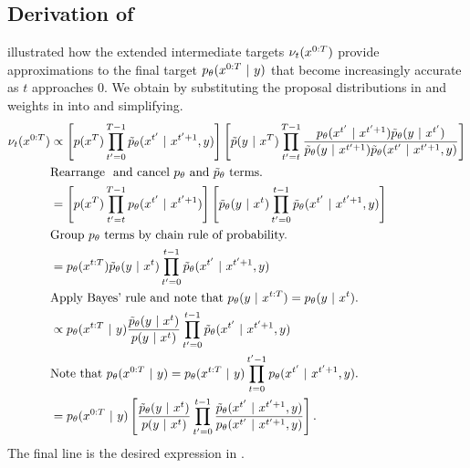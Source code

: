 \subsection{Derivation of }\label{sec:twisted_intermediates_derivation}
 illustrated how the extended intermediate targets $\nu_t(x^{0:T})$ provide approximations to the final target $p_{\theta}(x^{0:T} ~\vert~ y)$ that become increasingly accurate as $t$ approaches 0.
We obtain  by substituting the proposal distributions in  and weights in  into  and simplifying.
\begin{align}
   \nu_t(x^{0:T}) &\propto
   \left[p(x^{T})\prod_{t^\prime=0}^{T-1} \tilde p_\theta(x^{t^\prime} ~\vert~ x^{t^\prime+1}, y) \right]
   \left[
  \tilde p(y~\vert~ x^{T}) \prod_{t^\prime=t}^{T-1} 
    \frac{p_{\theta} (x^{t^\prime} ~\vert~ x^{t^\prime +1}) \tilde p_\theta(y~\vert~ x^{t^\prime})}{\tilde p_\theta(y ~\vert~ x^{t^\prime+1}) \tilde p_\theta(x^{t^\prime} ~\vert~ x^{t^\prime+1}, y)}
   \right]\\
   & \textrm{Rearrange \ and\ cancel\ }p_{\theta} \mathrm{\ and \ } \tilde p_\theta \textrm{\ terms.}\\ 
   &= \left[ p(x^{T}) \prod_{t^\prime=t}^{T-1} p_{\theta}(x^{t^\prime} ~\vert~  x^{t^\prime+1}) \right] \left[\tilde p_\theta(y~\vert~ x^{t})\prod_{t^\prime=0}^{t-1} \tilde p_\theta(x^{t^\prime} ~\vert~ x^{t^\prime +1}, y)\right]\\
   & \textrm{Group\ }p_{\theta} \textrm{\ terms by chain rule of probability.}\\ 
   &=  p_{\theta}(x^{t:T}) \tilde p_\theta (y~\vert~ x^{t}) \prod_{t^\prime=0}^{t-1} \tilde p_\theta (x^{t^\prime} ~\vert~ x^{t^\prime +1}, y)\\
   & \textrm{Apply\ Bayes'\ rule and note that } p_{\theta} (y~\vert~ x^{t:T}) = p_{\theta}(y~\vert~ x^{t}). \\
   &\propto p_{\theta}(x^{t:T}~\vert~ y) \frac{\tilde p_\theta(y~\vert~ x^{t})}{p(y ~\vert~ x^{t})} \prod_{t^\prime=0}^{t-1} \tilde p_\theta (x^{t^\prime} ~\vert~ x^{t^\prime +1}, y)\\
 & \textrm{Note that }  p_{\theta}(x^{0:T} ~\vert~ y) = p_{\theta} (x^{t:T} ~\vert~ y)   \prod_{t=0}^{t'-1} p_{\theta}(x^{t^\prime}~\vert~ x^{t^\prime + 1}, y). \\
   &=  p_{\theta}(x^{0:T}~\vert~ y) \left[\frac{\tilde p_\theta(y~\vert~ x^{t})}{p(y ~\vert~ x^{t})} \prod_{t^\prime=0}^{t-1} \frac{ \tilde p_\theta (x^{t^\prime} ~\vert~ x^{t^\prime +1}, y)}{
   p_{\theta}(x^{t^\prime}~\vert~ x^{t^\prime + 1}, y)}\right].
\end{align}
The final line is the desired expression in .
